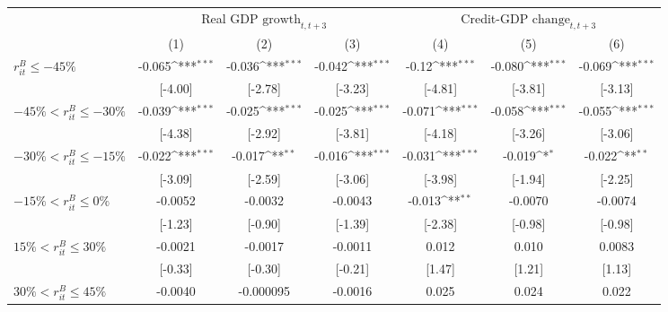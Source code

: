 {
\def\sym#1{\ifmmode^{#1}\else\(^{#1}\)\fi}
\begin{tabular}{l*{6}{c}}
\toprule
                &\multicolumn{3}{c}{Real GDP  \(\text{growth}_{t,t+3}\)} &\multicolumn{3}{c}{Credit-GDP \(\text{change}_{t,t+3}\)}\\\cmidrule(lr){2-4}\cmidrule(lr){5-7}
                &\multicolumn{1}{c}{(1)}         &\multicolumn{1}{c}{(2)}         &\multicolumn{1}{c}{(3)}         &\multicolumn{1}{c}{(4)}         &\multicolumn{1}{c}{(5)}         &\multicolumn{1}{c}{(6)}         \\
\midrule
\(r^B_{it} \leq -45\% \)&   -0.065\sym{***}&   -0.036\sym{***}&   -0.042\sym{***}&    -0.12\sym{***}&   -0.080\sym{***}&   -0.069\sym{***}\\
                &  [-4.00]         &  [-2.78]         &  [-3.23]         &  [-4.81]         &  [-3.81]         &  [-3.13]         \\
\addlinespace
\(-45\% < r^B_{it} \leq -30\% \)&   -0.039\sym{***}&   -0.025\sym{***}&   -0.025\sym{***}&   -0.071\sym{***}&   -0.058\sym{***}&   -0.055\sym{***}\\
                &  [-4.38]         &  [-2.92]         &  [-3.81]         &  [-4.18]         &  [-3.26]         &  [-3.06]         \\
\addlinespace
\(-30\% < r^B_{it} \leq -15\% \)&   -0.022\sym{***}&   -0.017\sym{**} &   -0.016\sym{***}&   -0.031\sym{***}&   -0.019\sym{*}  &   -0.022\sym{**} \\
                &  [-3.09]         &  [-2.59]         &  [-3.06]         &  [-3.98]         &  [-1.94]         &  [-2.25]         \\
\addlinespace
\(-15\% < r^B_{it} \leq 0\% \)&  -0.0052         &  -0.0032         &  -0.0043         &   -0.013\sym{**} &  -0.0070         &  -0.0074         \\
                &  [-1.23]         &  [-0.90]         &  [-1.39]         &  [-2.38]         &  [-0.98]         &  [-0.98]         \\
\addlinespace
\(15\% < r^B_{it} \leq 30\% \)&  -0.0021         &  -0.0017         &  -0.0011         &    0.012         &    0.010         &   0.0083         \\
                &  [-0.33]         &  [-0.30]         &  [-0.21]         &   [1.47]         &   [1.21]         &   [1.13]         \\
\addlinespace
\(30\% < r^B_{it} \leq 45\% \)&  -0.0040         &-0.000095         &  -0.0016         &    0.025         &    0.024         &    0.022         \\

\end{tabular}}
